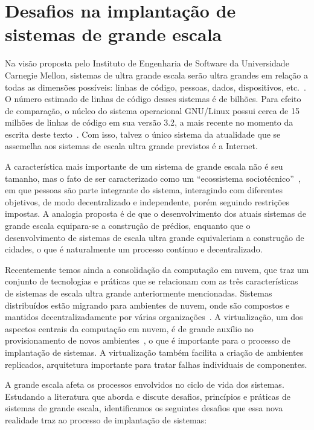 \section{Desafios na implantação de sistemas de grande escala}

Na visão proposta pelo Instituto de Engenharia de Software da Universidade Carnegie Mellon, sistemas de ultra grande escala serão ultra grandes em relação a todas as dimensões possíveis: linhas de código, pessoas, dados, dispositivos, etc.~\cite{CarnegieMellon2006ULS}. O número estimado de linhas de código desses sistemas é de bilhões. Para efeito de comparação, o núcleo do sistema operacional GNU/Linux possui cerca de 15 milhões de linhas de código em sua versão 3.2, a mais recente no momento da escrita deste texto~\cite{Leemhuis2012Statistics}. Com isso, talvez o único sistema da atualidade que se assemelha aos sistemas de escala ultra grande previstos é a Internet. 

A característica mais importante de um sistema de grande escala não é seu tamanho, mas o fato de ser caracterizado como um ``ecossistema sociotécnico''~\cite{CarnegieMellon2006ULS}, em que pessoas são parte integrante do sistema, interagindo com diferentes objetivos, de modo decentralizado e independente, porém seguindo restrições impostas. A analogia proposta é de que o desenvolvimento dos atuais sistemas de grande escala equipara-se a construção de prédios, enquanto que o desenvolvimento de sistemas de escala ultra grande equivaleriam a construção de cidades, o que é naturalmente um processo contínuo e decentralizado.

Recentemente temos ainda a consolidação da computação em nuvem, que traz um conjunto de tecnologias e práticas que se relacionam com as três características de sistemas de escala ultra grande anteriormente mencionadas. Sistemas distribuídos estão migrando para ambientes de nuvem, onde são compostos e mantidos decentralizadamente por várias organizações~\cite{Steen2011VeryLarge}. A virtualização, um dos aspectos centrais da computação em nuvem, é de grande auxílio no provisionamento de novos ambientes~\cite{Humble2011Continuous}, o que é importante para o processo de implantação de sistemas. A virtualização também facilita a criação de ambientes replicados, arquitetura importante para tratar falhas individuais de componentes.

A grande escala afeta os processos envolvidos no ciclo de vida dos sistemas.
Estudando a literatura que aborda e discute desafios, princípios e práticas de
sistemas de grande escala, identificamos os seguintes desafios que essa nova
realidade traz ao processo de implantação de sistemas:

